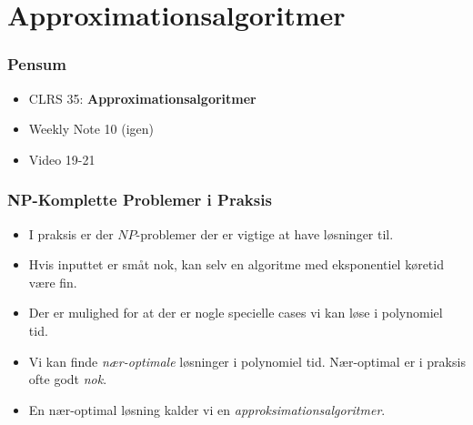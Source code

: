 \section{Approximationsalgoritmer}%
\label{sec:Approximationsalgoritmer}

\begin{frame}
	\frametitle{Pensum}
	\begin{itemize}
		\item CLRS 35: \textbf{Approximationsalgoritmer}
		\item Weekly Note 10 (igen)
		\item Video 19-21
	\end{itemize}
\end{frame}

\begin{frame}
	\frametitle{NP-Komplette Problemer i Praksis}
	\begin{itemize}
		\item I praksis er der $NP$-problemer der er vigtige at have løsninger til.
		\item Hvis inputtet er småt nok, kan selv en algoritme med eksponentiel køretid være fin.
		\item Der er mulighed for at der er nogle specielle cases vi kan løse i polynomiel tid.
		\item Vi kan finde \textit{nær-optimale} løsninger i polynomiel tid. Nær-optimal er i praksis ofte godt \textit{nok}.
		\item En nær-optimal løsning kalder vi en \textit{approksimationsalgoritmer}.
	\end{itemize}
\end{frame}

